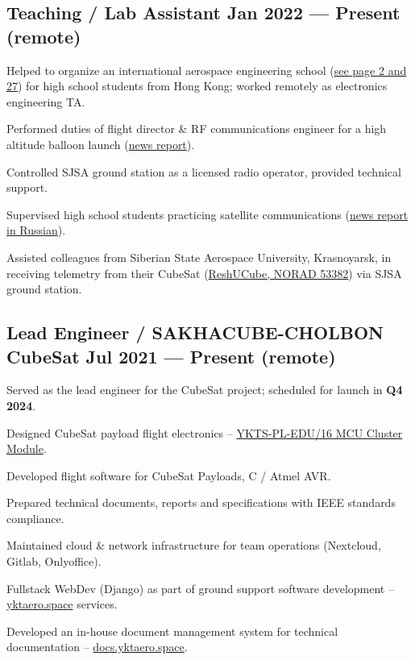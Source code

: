 \documentclass[letter,10pt]{article}
\begin{document}
\subsection{{Teaching / Lab Assistant \hfill Jan 2022 --- Present (remote)}}
\begin{zitemize}
\item Helped to organize an international aerospace engineering school (\href{https://www.luac.edu.hk/vineyard-2023-2024-issue-3/}{see page 2 and 27}) for high school students from Hong Kong; worked remotely as electronics engineering TA.
\item Performed duties of flight director \& RF communications engineer for a high altitude balloon launch (\href{https://news.tvb.com/tc/local/6643e73a27f15d1b8cd1baf6}{news report}).
\item Controlled SJSA ground station as a licensed radio operator, provided technical support.
\item Supervised high school students practicing satellite communications (\href{https://www.yakutia.kp.ru/daily/27434.5/4635501/}{news report in Russian}).
\item Assisted colleagues from Siberian State Aerospace University, Krasnoyarsk, in receiving telemetry from their CubeSat (\href{https://db.satnogs.org/satellite/EUTM-6475-4739-7036-7152}{ReshUCube, NORAD 53382}) via SJSA ground station.
\end{zitemize}

\subsection{{Lead Engineer / SAKHACUBE-CHOLBON CubeSat \hfill Jul 2021 --- Present (remote)}}
\begin{zitemize}
\item Served as the lead engineer for the CubeSat project; scheduled for launch in \textbf{Q4 2024}.
\item Designed CubeSat payload flight electronics -- \href{https://yktaero.space/projects/item/ykts-pl-edu16-sptx}{YKTS-PL-EDU/16 MCU Cluster Module}.
\item Developed flight software for CubeSat Payloads, C / Atmel AVR.
\item Prepared technical documents, reports and specifications with IEEE standards compliance.
\item Maintained cloud \& network infrastructure for team operations (Nextcloud, Gitlab, Onlyoffice).
\item Fullstack WebDev (Django) as part of ground support software development -- \url{yktaero.space} services.
\item Developed an in-house document management system for technical documentation -- \url{docs.yktaero.space}.
\end{zitemize}
\end{document}
